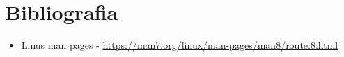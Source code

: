 \section{Bibliografia}


\begin{itemize}
    \item Linus man pages - \href{https://man7.org/linux/man-pages/man8/route.8.html}{https://man7.org/linux/man-pages/man8/route.8.html}
\end{itemize}
